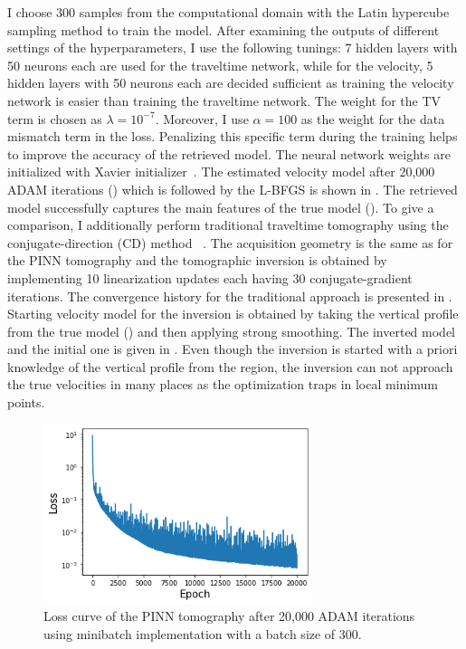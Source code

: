I choose 300 samples from the computational domain with the Latin hypercube sampling method to train the model. After examining the outputs of different settings of the hyperparameters, I use the following tunings: 7 hidden layers with 50 neurons each are used for the traveltime network, while for the velocity, 5 hidden layers with 50 neurons each are decided sufficient as training the velocity network is easier than training the traveltime network. The weight for the TV term is chosen as $\lambda = 10^{-7}$. Moreover, I use $\alpha = 100$ as the weight for the data mismatch term in the loss. Penalizing this specific term during the training helps to improve the accuracy of the retrieved model. The neural network weights are initialized with Xavier initializer~\cite{gb:10}. The estimated velocity model after 20,000 ADAM iterations () which is followed by the L-BFGS is shown in . The retrieved model successfully captures the main features of the true model (). To give a comparison, I additionally perform traditional traveltime tomography using the conjugate-direction (CD) method ~\cite{c:14}. The acquisition geometry is the same as for the PINN tomography and the tomographic inversion is obtained by implementing 10 linearization updates each having 30 conjugate-gradient iterations. The convergence history for the traditional approach is presented in . Starting velocity model for the inversion is obtained by taking the vertical profile from the true model () and then applying strong smoothing. The inverted model and the initial one is given in . Even though the inversion is started with a priori knowledge of the vertical profile from the region, the inversion can not approach the true velocities in many places as the optimization traps in local minimum points.

\begin{figure}
 \centering
 \includegraphics[width=0.7\textwidth]{figures/chap03_pinn_enabled/folded_loss_curve} 
 \caption{Loss curve of the PINN tomography after 20,000 ADAM iterations using minibatch implementation with a batch size of 300.}
 \label{fig:folded_loss_curve}
\end{figure}


